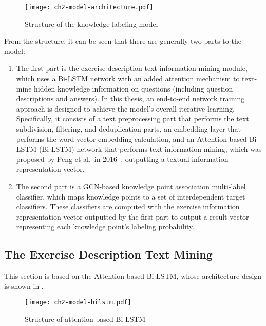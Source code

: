 \begin{figure}[htbp!]
    \centering
    \texttt{[image: ch2-model-architecture.pdf]}
    \caption{Structure of the knowledge labeling model}\label{fig:ch2-modelarchitecture}
\end{figure}




From the structure, it can be seen that there are generally two parts to the model:
\begin{enumerate}
    \item The first part is the exercise description text information mining module, which uses a Bi-LSTM network with an added attention mechanism to text-mine hidden knowledge information on questions (including question descriptions and answers). In this thesis, an end-to-end network training approach is designed to achieve the model's overall iterative learning. Specifically, it consists of a text preprocessing part that performs the text subdivision, filtering, and deduplication parts, an embedding layer that performs the word vector embedding calculation, and an Attention-based Bi-LSTM (Bi-LSTM) network that performs text information mining, which was proposed by Peng et al.\ in 2016~\cite{zhou2016attention}, outputting a textual information representation vector.
    \item The second part is a GCN-based knowledge point association multi-label classifier, which maps knowledge points to a set of interdependent target classifiers. These classifiers are computed with the exercise information representation vector outputted by the first part to output a result vector representing each knowledge point's labeling probability.
\end{enumerate}


\subsection{The Exercise Description Text Mining}
This section is based on the Attention based Bi-LSTM, whose architecture design is shown in \figname{\ref{fig:ch2-model-bilstm}}.
\begin{figure}[htbp!]
    \centering
    \texttt{[image: ch2-model-bilstm.pdf]}
    \caption{Structure of attention based Bi-LSTM}\label{fig:ch2-model-bilstm}
\end{figure}

